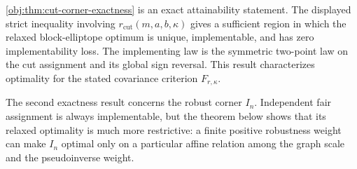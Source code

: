 \cref{obj:thm:cut-corner-exactness} is an exact attainability statement. The displayed strict inequality involving \(r_{\mathrm{cut}}(m,a,b,\kappa)\) gives a sufficient region in which the relaxed block-elliptope optimum is unique, implementable, and has zero implementability loss. The implementing law  is the symmetric two-point law on the cut assignment and its global sign reversal. This result characterizes optimality for the stated covariance criterion \(F_{r,\kappa}\).

The second exactness result concerns the robust corner \(I_n\). Independent fair assignment is always implementable, but the theorem below shows that its relaxed optimality is much more restrictive: a finite positive robustness weight can make \(I_n\) optimal only on a particular affine relation among the graph scale and the pseudoinverse weight.

